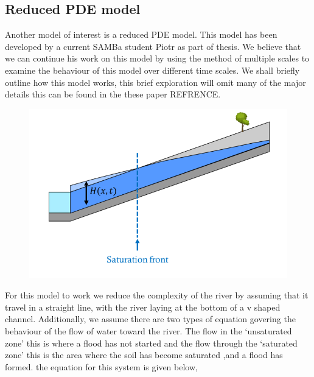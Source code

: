 \documentclass[11pt]{article}
\begin{document}
\subsection{Reduced PDE model}

Another model of interest is a reduced PDE model. This model has been developed by a current SAMBa student Piotr as part of thesis. We believe that we can continue his work on this model by using the method of multiple scales to examine the behaviour of this model over different time scales.
We shall briefly outline how this model works, this brief exploration will omit many of the major details this can be found in the these paper REFRENCE.
\\

\begin{minipage}{0.45\textwidth}
    \begin{figure}[H]%
    \centering
    \includegraphics[width=\textwidth]{Figs/Simple model.png}
    \label{fig:model}
    \end{figure}
\end{minipage}
\hspace{0.05\textwidth}
\begin{minipage}{0,45\textwidth}
     \hspace{0pt} For this model to work we reduce the complexity of the river by assuming that it travel in a straight line, with the river laying at the bottom of a v shaped channel. Additionally, we assume there are two types of equation govering the behaviour of the flow of water toward the river. 
    The flow in the `unsaturated zone' this is where a flood has not started and the flow through the `saturated zone' this is the area where the soil has become saturated ,and a flood has formed. the equation for this system is given below,
    
\end{minipage}
\end{document}

